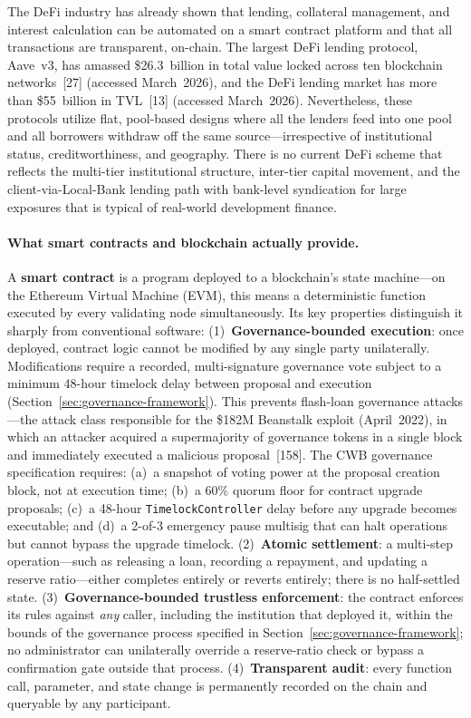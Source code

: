 \documentclass[12pt,a4paper]{report}
\begin{document}
The DeFi industry has already shown that lending, collateral management, and interest calculation can be automated on a smart contract platform and that all transactions are transparent, on-chain. The largest DeFi lending protocol, Aave~v3, has amassed \$26.3~billion in total value locked across ten blockchain networks~[27] (accessed March~2026), and the DeFi lending market has more than \$55~billion in TVL~[13] (accessed March~2026). Nevertheless, these protocols utilize flat, pool-based designs where all the lenders feed into one pool and all borrowers withdraw off the same source---irrespective of institutional status, creditworthiness, and geography. There is no current DeFi scheme that reflects the multi-tier institutional structure, inter-tier capital movement, and the client-via-Local-Bank lending path with bank-level syndication for large exposures that is typical of real-world development finance.

\paragraph{What smart contracts and blockchain actually provide.}
A \textbf{smart contract} is a program deployed to a blockchain's state machine---on the Ethereum Virtual Machine (EVM), this means a deterministic function executed by every validating node simultaneously. Its key properties distinguish it sharply from conventional software: (1)~\textbf{Governance-bounded execution}: once deployed, contract logic cannot be modified by any single party unilaterally. Modifications require a recorded, multi-signature governance vote subject to a minimum 48-hour timelock delay between proposal and execution (Section~\ref{sec:governance-framework}). This prevents flash-loan governance attacks---the attack class responsible for the \$182M Beanstalk exploit (April~2022), in which an attacker acquired a supermajority of governance tokens in a single block and immediately executed a malicious proposal~[158]. The CWB governance specification requires: (a)~a snapshot of voting power at the proposal creation block, not at execution time; (b)~a 60\% quorum floor for contract upgrade proposals; (c)~a 48-hour \texttt{TimelockController} delay before any upgrade becomes executable; and (d)~a 2-of-3 emergency pause multisig that can halt operations but cannot bypass the upgrade timelock. (2)~\textbf{Atomic settlement}: a multi-step operation---such as releasing a loan, recording a repayment, and updating a reserve ratio---either completes entirely or reverts entirely; there is no half-settled state. (3)~\textbf{Governance-bounded trustless enforcement}: the contract enforces its rules against \textit{any} caller, including the institution that deployed it, within the bounds of the governance process specified in Section~\ref{sec:governance-framework}; no administrator can unilaterally override a reserve-ratio check or bypass a confirmation gate outside that process. (4)~\textbf{Transparent audit}: every function call, parameter, and state change is permanently recorded on the chain and queryable by any participant.
\end{document}
